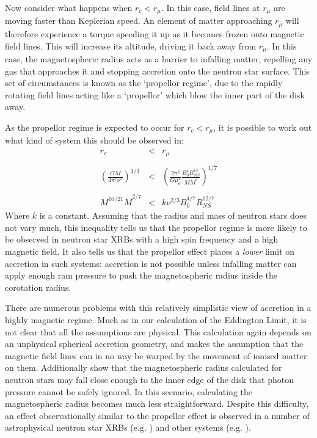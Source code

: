 \par Now consider what happens when $r_c<r_\mu$.  In this case, field lines at $r_\mu$ are moving faster than Keplerian speed.  An element of matter approaching $r_\mu$ will therefore experience a torque speeding it up as it becomes frozen onto magnetic field lines.  This will increase its altitude, driving it back away from $r_\mu$.  In this case, the magnetospheric radius acts as a barrier to infalling matter, repelling any gas that approaches it and stopping accretion onto the neutron star surface.  This set of circumstances is known as the `propellor regime', due to the rapidly rotating field lines acting like a `propellor' which blow the inner part of the disk away.
\par As the propellor regime is expected to occur for $r_c<r_\mu$, it is possible to work out what kind of system this should be observed in:
\begin{eqnarray}
r_c&<&r_\mu\\ \nonumber \\
\left(\frac{GM}{4\pi^2\nu^2}\right)^{1/3}&<&\left(\frac{2\pi^2}{G\mu_0^2}\frac{B_0^4R_{NS}^{12}}{M\dot{M}^2}\right)^{1/7}\\ \nonumber \\
M^{10/21}\dot{M}^{2/7}&<&k\nu^{2/3}B_0^{4/7}R_{NS}^{12/7}
\end{eqnarray}
Where $k$ is a constant.  Assuming that the radius and mass of neutron stars does not vary much, this inequality tells us that the propellor regime is more likely to be observed in neutron star XRBs with a high spin frequency and a high magnetic field.  It also tells us that the propellor effect places a \textit{lower} limit on accretion in such systems: accretion is not possible unless infalling matter can apply enough ram pressure to push the magnetospheric radius inside the corotation radius.
\par There are numerous problems with this relatively simplistic view of accretion in a highly magnetic regime.  Much as in our calculation of the Eddington Limit, it is not clear that all the assumptions are physical.  This calculation again depends on an unphysical spherical accretion geometry, and makes the assumption that the magnetic field lines can in no way be warped by the movement of ionised matter on them.  Additionally \citet{White_MRad} show that the magnetospheric radius calculated for neutron stars may fall close enough to the inner edge of the disk that photon pressure cannot be safely ignored.  In this scenario, calculating the magnetospheric radius becomes much less straightforward.  Despite this difficulty, an effect observationally similar to the propellor effect is observed in a number of astrophysical neutron star XRBs (e.g. \citealp{Fabian_Propex,Furst_Propex}) and other systems (e.g. \citep{Campana_PropBorder}).

